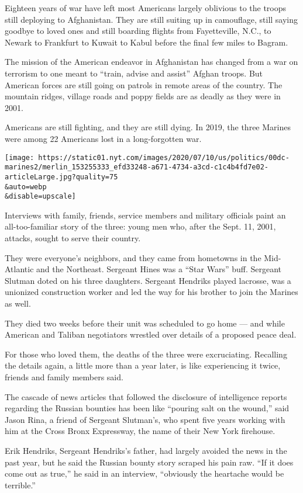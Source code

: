 Eighteen years of war have left most Americans largely oblivious to the
troops still deploying to Afghanistan. They are still suiting up in
camouflage, still saying goodbye to loved ones and still boarding
flights from Fayetteville, N.C., to Newark to Frankfurt to Kuwait to
Kabul before the final few miles to Bagram.

The mission of the American endeavor in Afghanistan has changed from a
war on terrorism to one meant to ``train, advise and assist'' Afghan
troops. But American forces are still going on patrols in remote areas
of the country. The mountain ridges, village roads and poppy fields are
as deadly as they were in 2001.

Americans are still fighting, and they are still dying. In 2019, the
three Marines were among 22 Americans lost in a long-forgotten war.

\texttt{[image: https://static01.nyt.com/images/2020/07/10/us/politics/00dc-marines2/merlin\_153255333\_efd33248-a671-4734-a3cd-c1c4b4fd7e02-articleLarge.jpg?quality=75\\\&auto=webp\\\&disable=upscale]}

Interviews with family, friends, service members and military officials
paint an all-too-familiar story of the three: young men who, after the
Sept. 11, 2001, attacks, sought to serve their country.

They were everyone's neighbors, and they came from hometowns in the
Mid-Atlantic and the Northeast. Sergeant Hines was a ``Star Wars'' buff.
Sergeant Slutman doted on his three daughters. Sergeant Hendriks played
lacrosse, was a unionized construction worker and led the way for his
brother to join the Marines as well.

They died two weeks before their unit was scheduled to go home --- and
while American and Taliban negotiators wrestled over details of a
proposed peace deal.

For those who loved them, the deaths of the three were excruciating.
Recalling the details again, a little more than a year later, is like
experiencing it twice, friends and family members said.

The cascade of news articles that followed the disclosure of
intelligence reports regarding the Russian bounties has been like
``pouring salt on the wound,'' said Jason Rina, a friend of Sergeant
Slutman's, who spent five years working with him at the Cross Bronx
Expressway, the name of their New York firehouse.

Erik Hendriks, Sergeant Hendriks's father, had largely avoided the news
in the past year, but he said the Russian bounty story scraped his pain
raw. ``If it does come out as true,'' he said in an interview,
``obviously the heartache would be terrible.''

